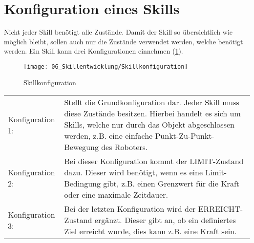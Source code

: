 \section{Konfiguration eines Skills} \label{Skillkonfiguration}
	Nicht jeder Skill benötigt alle Zustände. Damit der Skill so übersichtlich wie möglich bleibt, sollen auch nur die Zustände verwendet werden, welche benötigt werden. Ein Skill kann drei Konfigurationen einnehmen (\ref{fig:Skillkonfiguration}).
	\\
	\begin{figure}[h!]
		\centering
		\texttt{[image: 06\_Skillentwicklung/Skillkonfiguration]}
		\captionsetup{justification=centering}
		\caption{Skillkonfiguration}
		\label{fig:Skillkonfiguration}
	\end{figure}
	
	\begin{tabularx}{\textwidth}{@{}>{}p{8em} X@{}}
		Konfiguration 1: & 
		Stellt die Grundkonfiguration dar. Jeder Skill muss diese Zustände besitzen. Hierbei handelt es sich um Skills, welche nur durch das Objekt abgeschlossen werden, z.B. eine einfache Punkt-Zu-Punkt-Bewegung des Roboters.
		\\
		Konfiguration 2: & 
		Bei dieser Konfiguration kommt der LIMIT-Zustand dazu. Dieser wird benötigt, wenn es eine Limit-Bedingung gibt, z.B. einen Grenzwert für die Kraft oder eine maximale Zeitdauer.
		\\
		Konfiguration 3: & 
		Bei der letzten Konfiguration wird der ERREICHT-Zustand ergänzt. Dieser gibt an, ob ein definiertes Ziel erreicht wurde, dies kann z.B. eine Kraft sein.
		\\
	\end{tabularx}